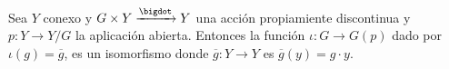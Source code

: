 \begin{ejercicio}
\label{eje: G cong G(p)}
    Sea $Y$ conexo y $G\times Y\xrightarrow{\bigdot} Y$ una acción propiamiente discontinua y $p:Y\to Y/G$ la aplicación abierta. Entonces la función $\iota:G\to G(p)$ dado por $\iota(g)=\overline{g}$, es un isomorfismo donde $\overline{g}:Y\to Y$ es $\overline{g}(y)=g\cdot y.$ 
\end{ejercicio}

\begin{demostracion}

\end{demostracion}
